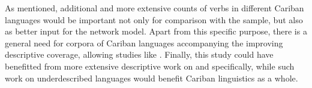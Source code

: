 As mentioned, additional and more extensive counts of  verbs in different Cariban languages would be important not only for comparison with the \apalai sample, but also as better input for the network model.
Apart from this specific purpose, there is a general need for corpora of Cariban languages accompanying the improving descriptive coverage, allowing studies like \textcite{sapien2021antipassive}.
Finally, this study could have benefitted from more extensive descriptive work on \yukpa and \carijo specifically, while such work on underdescribed languages would benefit Cariban linguistics as a whole.
%

